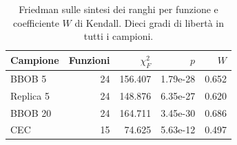 \begin{table}[H]\centering\small
\caption{Friedman sulle sintesi dei ranghi per funzione e coefficiente $W$ di Kendall. Dieci gradi di libertà in tutti i campioni.}\label{tab:omnibus}
\begin{tabular}{@{}lrrrr@{}}
\toprule Campione & Funzioni & $\chi^2_F$ & $p$ & $W$\\\midrule
BBOB 5 & 24 & 156.407 & 1.79e-28 & 0.652\\
Replica 5 & 24 & 148.876 & 6.35e-27 & 0.620\\
BBOB 20 & 24 & 164.711 & 3.45e-30 & 0.686\\
CEC & 15 & 74.625 & 5.63e-12 & 0.497\\
\bottomrule\end{tabular}
\end{table}
